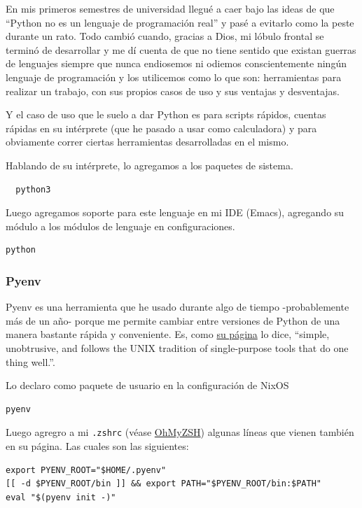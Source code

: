 \documentclass[11pt]{article}
\begin{document}
En mis primeros semestres de universidad llegué a caer bajo las ideas de que ``Python no es un lenguaje de programación real'' y pasé a evitarlo como la peste durante un rato. Todo cambió cuando, gracias a Dios, mi lóbulo frontal se terminó de desarrollar y me dí cuenta de que no tiene sentido que existan guerras de lenguajes siempre que nunca endiosemos ni odiemos conscientemente ningún lenguaje de programación y los utilicemos como lo que son: herramientas para realizar un trabajo, con sus propios casos de uso y sus ventajas y desventajas.

Y el caso de uso que le suelo a dar Python es para scripts rápidos, cuentas rápidas en su intérprete (que he pasado a usar como calculadora) y para obviamente correr ciertas herramientas desarrolladas en el mismo.

Hablando de su intérprete, lo agregamos a los paquetes de sistema.

\begin{verbatim}
  python3
\end{verbatim}

Luego agregamos soporte para este lenguaje en mi IDE (Emacs), agregando su módulo a los módulos de lenguaje en configuraciones.

\begin{verbatim}
python
\end{verbatim}
\subsubsection{Pyenv}
\label{sec:org16549c4}

Pyenv es una herramienta que he usado durante algo de tiempo -probablemente más de un año- porque me permite cambiar entre versiones de Python de una manera bastante rápida y conveniente. Es, como \href{https://github.com/pyenv/pyenv}{su página} lo dice, ``simple, unobtrusive, and follows the UNIX tradition of single-purpose tools that do one thing well.''.

Lo declaro como paquete de usuario en la configuración de NixOS

\begin{verbatim}
pyenv
\end{verbatim}

Luego agregro a mi \texttt{.zshrc} (véase \hyperref[sec:org42cb61e]{OhMyZSH}) algunas líneas que vienen también en su página. Las cuales son las siguientes:

\begin{verbatim}
export PYENV_ROOT="$HOME/.pyenv"
[[ -d $PYENV_ROOT/bin ]] && export PATH="$PYENV_ROOT/bin:$PATH"
eval "$(pyenv init -)"
\end{verbatim}
\end{document}
